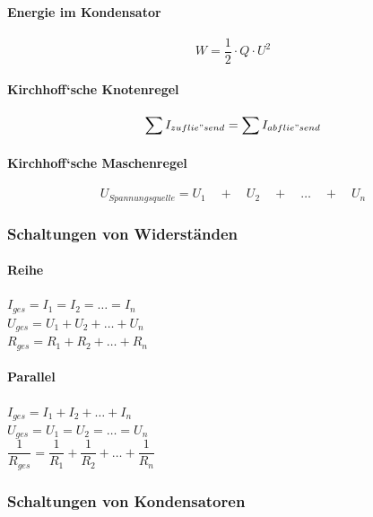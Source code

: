 \documentclass[a4paper]{article}
\begin{document}
\paragraph{Energie im Kondensator}
\large$$W = \frac{1}{2} \cdot Q \cdot U^2$$\normalsize

\paragraph{Kirchhoff‘sche Knotenregel}
\Large$$\sum{I_{zuflie"send}} = \sum{I_{abflie"send}}$$\normalsize
    
\paragraph{Kirchhoff‘sche Maschenregel}
\Large$$U_{Spannungsquelle} = U_1 \quad + \quad U_2 \quad + \quad \dots \quad + \quad U_n$$\normalsize




\subsubsection{Schaltungen von Widerständen}

\paragraph{Reihe}

\begin{center}
	\Large
		$I_{ges} = I_1 = I_2 = … = I_n$\\[0,5cm]
		$U_{ges} = U_1 + U_2 + … + U_n$\\[0,5cm]
		$R_{ges} = R_1 + R_2 + … + R_n$\\[1cm]
	\normalsize
\end{center}


\paragraph{Parallel}

\begin{center}
	\Large
		$I_{ges} = I_1 + I_2 + … + I_n$\\[0,5cm]
		$U_{ges} = U_1 = U_2 = … = U_n$\\[0,5cm]
		$\dfrac{1}{R_{ges}} = \dfrac{1}{R_1} + \dfrac{1}{R_2} + … + \dfrac{1}{R_n}$\\[1cm]
	\normalsize
\end{center}



\subsubsection{Schaltungen von Kondensatoren}
\end{document}
